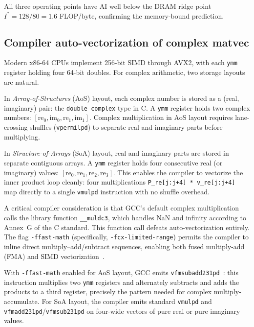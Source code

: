 \documentclass[a4paper,noarxiv]{quantumarticle}
\begin{document}
All three operating points have AI well below the DRAM ridge point
$I^* = 128/80 = 1.6$ FLOP/byte, confirming the memory-bound prediction.

\subsection{Compiler auto-vectorization of complex matvec}
\label{sec:autovec_bg}

Modern x86-64 CPUs implement 256-bit SIMD through AVX2, with each
\texttt{ymm} register holding four 64-bit doubles. For complex arithmetic,
two storage layouts are natural.

In \emph{Array-of-Structures} (AoS) layout, each complex number is stored
as a (real, imaginary) pair: the \texttt{double complex} type in C. A
\texttt{ymm} register holds two complex numbers:
$[\mathrm{re}_0, \mathrm{im}_0, \mathrm{re}_1, \mathrm{im}_1]$. Complex
multiplication in AoS layout requires lane-crossing shuffles
(\texttt{vpermilpd}) to separate real and imaginary parts before multiplying.

In \emph{Structure-of-Arrays} (SoA) layout, real and imaginary parts are
stored in separate contiguous arrays. A \texttt{ymm} register holds four
consecutive real (or imaginary) values:
$[\mathrm{re}_0, \mathrm{re}_1, \mathrm{re}_2, \mathrm{re}_3]$. This
enables the compiler to vectorize the inner product loop cleanly: four
multiplications \texttt{P\_re[j:j+4] * v\_re[j:j+4]} map directly to a
single \texttt{vmulpd} instruction with no shuffle overhead.

A critical compiler consideration is that GCC's default complex
multiplication calls the library function \texttt{\_\_muldc3}, which handles
NaN and infinity according to Annex~G of the C standard. This function call
defeats auto-vectorization entirely. The flag \texttt{-ffast-math}
(specifically, \texttt{-fcx-limited-range}) permits the compiler to inline
direct multiply--add/subtract sequences, enabling both fused multiply-add
(FMA) and SIMD vectorization~\cite{AgnerFog}.

With \texttt{-ffast-math} enabled for AoS layout, GCC emits
\texttt{vfmsubadd231pd}~\cite{IntelIntrinsics}: this instruction multiplies
two \texttt{ymm} registers and alternately subtracts and adds the products
to a third register, precisely the pattern needed for complex
multiply-accumulate. For SoA layout, the compiler emits standard
\texttt{vmulpd} and \texttt{vfmadd231pd}/\texttt{vfmsub231pd} on four-wide
vectors of pure real or pure imaginary values.
\end{document}
